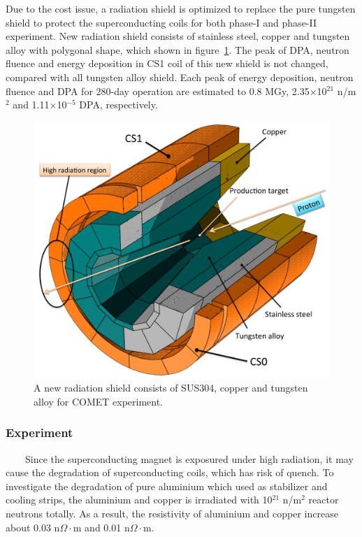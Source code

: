 \documentclass[a4paper, 10pt, twocolumn]{article}
\begin{document}
Due to the cost issue, a radiation shield is optimized to replace the pure tungsten shield to protect the superconducting coils for both phase-I and phase-II experiment.
New radiation shield consists of stainless steel, copper and tungsten alloy with polygonal shape, which shown in figure~\ref{shield}.
The peak of DPA, neutron fluence and energy deposition in CS1 coil of this new shield is not changed, compared with all tungsten alloy shield.
Each peak of energy deposition, neutron fluence and DPA for 280-day operation are estimated to 0.8 MGy, 2.35$\times$10$^{21}$ n/m$^2$ and 1.11$\times$10$^{-5}$ DPA, respectively.
\begin{figure}[H]
 \centering
 \includegraphics[scale=0.2]{fig/shielding.pdf}
 \caption{A new radiation shield consists of SUS304, copper and tungsten alloy for COMET experiment.}
 \label{shield}
\end{figure}

\subsubsection*{Experiment}
~~~~Since the superconducting magnet is exposured under high radiation, it may cause the degradation of superconducting coils, which has risk of quench.
To investigate the degradation of pure aluminium which used as stabilizer and cooling strips, the aluminium and copper is irradiated with 10$^{21}$ n/m$^2$ reactor neutrons totally.
As a result, the resistivity of aluminium and copper increase about 0.03 n$\Omega\cdot$m and 0.01 n$\Omega\cdot$m.
\end{document}
